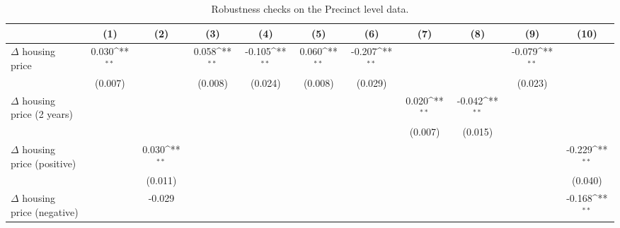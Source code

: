 \begin{sidewaystable}[htbp]\centering
\def\sym#1{\ifmmode^{#1}\else\(^{#1}\)\fi}
\caption{Robustness checks on the Precinct level data.} \label{apdxprerobust}
\begin{tabular}{l*{10}{c}}
\hline\hline
                    &\multicolumn{1}{c}{(1)}        &\multicolumn{1}{c}{(2)}        &\multicolumn{1}{c}{(3)}        &\multicolumn{1}{c}{(4)}        &\multicolumn{1}{c}{(5)}        &\multicolumn{1}{c}{(6)}        &\multicolumn{1}{c}{(7)}        &\multicolumn{1}{c}{(8)}        &\multicolumn{1}{c}{(9)}        &\multicolumn{1}{c}{(10)}        \\
\hline
$\Delta$ housing price&       0.030\sym{**}&                    &       0.058\sym{**}&      -0.105\sym{**}&       0.060\sym{**}&      -0.207\sym{**}&                    &                    &      -0.079\sym{**}&                    \\
                    &     (0.007)        &                    &     (0.008)        &     (0.024)        &     (0.008)        &     (0.029)        &                    &                    &     (0.023)        &                    \\
[1em]
$\Delta$ housing price (2 years)&                    &                    &                    &                    &                    &                    &       0.020\sym{**}&      -0.042\sym{**}&                    &                    \\
                    &                    &                    &                    &                    &                    &                    &     (0.007)        &     (0.015)        &                    &                    \\
[1em]
$\Delta$ housing price (positive)&                    &       0.030\sym{**}&                    &                    &                    &                    &                    &                    &                    &      -0.229\sym{**}\\
                    &                    &     (0.011)        &                    &                    &                    &                    &                    &                    &                    &     (0.040)        \\
[1em]
$\Delta$ housing price (negative)&                    &      -0.029        &                    &                    &                    &                    &                    &                    &                    &      -0.168\sym{**}\\

\end{tabular}
\end{sidewaystable}
